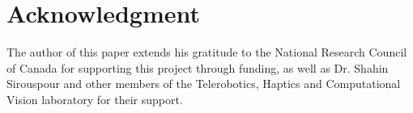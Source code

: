 \documentclass[conference]{IEEEtran}
\begin{document}
\section*{Acknowledgment}
The author of this paper extends his gratitude to the National Research Council of Canada for supporting this project through funding, as well as Dr. Shahin Sirouspour and other members of the Telerobotics, Haptics and Computational Vision laboratory for their support.  






\end{document}
